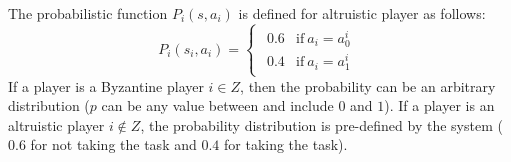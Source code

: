 The probabilistic function $P_i(s, a_i)$ is defined for altruistic player as follows:
\begin{equation*}
P_i(s_i, a_i)=
\begin{cases}

\begin{array}{ll}
0.6& \mbox{if}\  a_i=a^i_0\\
0.4 &\mbox{if}\  a_i=a^i_1
\end{array}

\end{cases}
\end{equation*}
If a player is a Byzantine player $i\in Z$, then the probability can be an arbitrary distribution ($p$ can be any value between and include $0$ and $1$).
If a player is an altruistic player $i\not\in Z$, the probability distribution is pre-defined by the system ($0.6$ for not taking the task and $0.4$ for taking the task).


